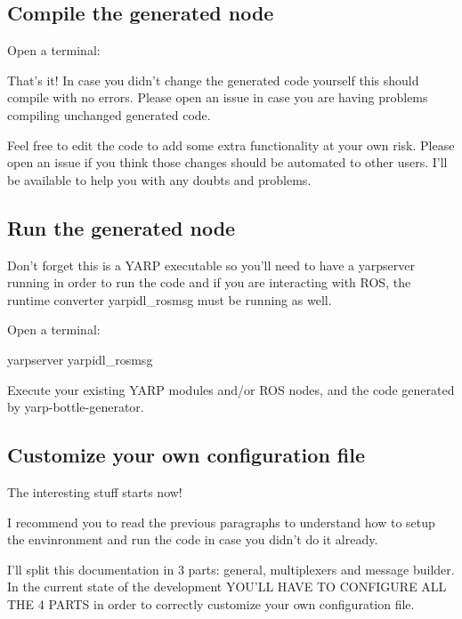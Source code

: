 \subsection*{Compile the generated node}

Open a terminal\-: 


That's it! In case you didn't change the generated code yourself this should compile with no errors. Please open an issue in case you are having problems compiling unchanged generated code.

Feel free to edit the code to add some extra functionality at your own risk. Please open an issue if you think those changes should be automated to other users. I'll be available to help you with any doubts and problems.

\subsection*{Run the generated node}

Don't forget this is a Y\-A\-R\-P executable so you'll need to have a {\ttfamily yarpserver} running in order to run the code and if you are interacting with R\-O\-S, the runtime converter {\ttfamily yarpidl\-\_\-rosmsg} must be running as well.

Open a terminal\-: \begin{DoxyVerb}yarpserver
yarpidl_rosmsg
\end{DoxyVerb}


Execute your existing Y\-A\-R\-P modules and/or R\-O\-S nodes, and the code generated by yarp-\/bottle-\/generator.

\subsection*{Customize your own configuration file}

The interesting stuff starts now!

I recommend you to read the previous paragraphs to understand how to setup the envinronment and run the code in case you didn't do it already.

I'll split this documentation in 3 parts\-: general, multiplexers and message builder. In the current state of the development Y\-O\-U'L\-L H\-A\-V\-E T\-O C\-O\-N\-F\-I\-G\-U\-R\-E A\-L\-L T\-H\-E 4 P\-A\-R\-T\-S in order to correctly customize your own configuration file.


